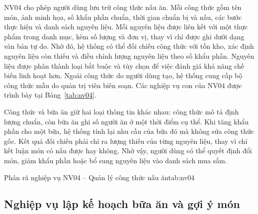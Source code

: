 NV04 cho phép người dùng lưu trữ công thức nấu ăn. Mỗi công thức gồm tên món, ảnh minh họa, số khẩu phần chuẩn, thời gian chuẩn bị và nấu, các bước thực hiện và danh sách nguyên liệu. Mỗi nguyên liệu được liên kết với một thực phẩm trong danh mục, kèm số lượng và đơn vị, thay vì chỉ được ghi dưới dạng văn bản tự do. Nhờ đó, hệ thống có thể đối chiếu công thức với tồn kho, xác định nguyên liệu còn thiếu và điều chỉnh lượng nguyên liệu theo số khẩu phần. Nguyên liệu được phân thành loại bắt buộc và tùy chọn để việc đánh giá khả năng chế biến linh hoạt hơn. Ngoài công thức do người dùng tạo, hệ thống cung cấp bộ công thức mẫu do quản trị viên biên soạn. Các nghiệp vụ con của NV04 được trình bày tại Bảng~\ref{tab:nv04}.

Công thức và bữa ăn giữ hai loại thông tin khác nhau: công thức mô tả định lượng chuẩn, còn bữa ăn ghi số người ăn ở một thời điểm cụ thể. Khi tăng khẩu phần cho một bữa, hệ thống tính lại nhu cầu của bữa đó mà không sửa công thức gốc. Kết quả đối chiếu phải chỉ ra lượng thiếu của từng nguyên liệu, thay vì chỉ kết luận món có nấu được hay không. Nhờ vậy, người dùng có thể quyết định đổi món, giảm khẩu phần hoặc bổ sung nguyên liệu vào danh sách mua sắm.

\begin{nvtable}{Phân rã nghiệp vụ NV04 – Quản lý công thức nấu ăn}{tab:nv04}
\end{nvtable}

\subsection{Nghiệp vụ lập kế hoạch bữa ăn và gợi ý món}\label{ssec:nv05}

